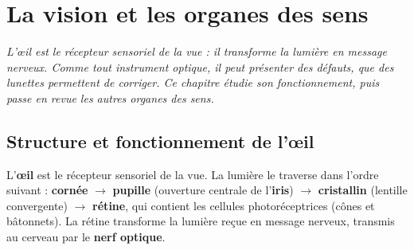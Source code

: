 \chapter{La vision et les organes des sens}

\noindent\textit{L'œil est le récepteur sensoriel de la vue : il transforme la lumière en
message nerveux. Comme tout instrument optique, il peut présenter des défauts, que des
lunettes permettent de corriger. Ce chapitre étudie son fonctionnement, puis passe en
revue les autres organes des sens.}
\vspace{8pt}

\connecteBanner

\section{Structure et fonctionnement de l'œil}

\begin{definition}
L'\textbf{œil} est le récepteur sensoriel de la vue. La lumière le traverse dans l'ordre
suivant : \textbf{cornée} $\to$ \textbf{pupille} (ouverture centrale de l'\textbf{iris})
$\to$ \textbf{cristallin} (lentille convergente) $\to$ \textbf{rétine}, qui contient les
cellules photoréceptrices (cônes et bâtonnets). La rétine transforme la lumière reçue en
message nerveux, transmis au cerveau par le \textbf{nerf optique}.
\end{definition}

\begin{illus}
\end{illus}

